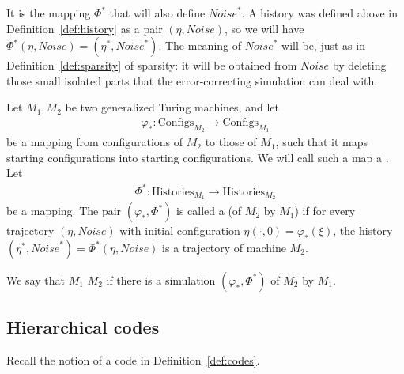 \documentclass[12pt]{memoir}
\newcommand{\Configs}{\mathrm{Configs}}
\newcommand{\Noise}{\mathit{Noise}}
\newcommand{\Histories}{\mathrm{Histories}}
\begin{document}
It is the mapping \( \Phi^{*} \) that will also define \( \Noise^{*} \).
A history was defined above in Definition~\ref{def:history} 
as a pair \( (\eta,\Noise) \), so we will have
\( \Phi^{*}(\eta,\Noise)=(\eta^{*},\Noise^{*}) \).
The meaning of \( \Noise^{*} \) will be, just as in Definition~\ref{def:sparsity} of sparsity:
it will be obtained from \( \Noise \) by deleting those small isolated parts that the 
error-correcting simulation can deal with.

\begin{definition}[Simulation] \label{def:simulation-central}
Let \( M_{1},M_{2} \) be two generalized Turing machines, and let
\begin{align*}
    \varphi_{*}:\Configs_{M_{2}} \to \Configs_{M_{1}}
\end{align*}
be a mapping from configurations of \( M_{2} \)
to those of \( M_{1} \), such that it maps
starting configurations into starting configurations.
We will call such a map a .
Let
\begin{align*}
   \Phi^{*}:\Histories_{M_{1}} \to \Histories_{M_{2}}
\end{align*}
be a mapping.
The pair \( (\varphi_{*}, \Phi^{*})  \)
is called a  (of \(  M_{2}  \) by \(  M_{1}  \)) if for every
trajectory \(  (\eta, \Noise)  \) with initial
configuration \(  \eta(\cdot,0)=\varphi_{*}(\xi)  \),
the history \(  (\eta^{*},\Noise^{*})=\Phi^{*}(\eta,\Noise)  \) is
a trajectory of machine \(  M_{2}  \).

We say that \( M_{1} \)  \( M_{2} \) if there is a simulation
\( (\varphi_{*},\Phi^{*}) \) of \( M_{2} \) by \( M_{1} \).
\end{definition}

\subsection{Hierarchical codes}\label{sec:hier-codes}

Recall the notion of a code in Definition~\ref{def:codes}.
\end{document}
